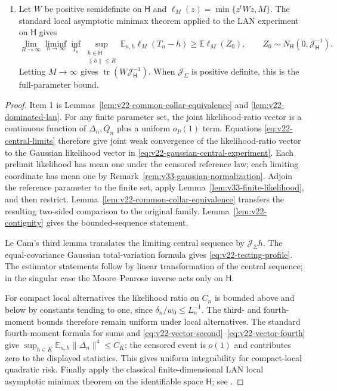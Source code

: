 \begin{theorem}
\begin{enumerate}
\item Let $W$ be positive semidefinite on $\mathsf H$ and
$\ell_M(z)=\min\{z^tWz,M\}$.  The standard local asymptotic minimax theorem
applied to the LAN experiment on $\mathsf H$ gives
\begin{equation}\label{eq:v22-minimax-truncated}
 \lim_{R\to\infty}\liminf_{n\to\infty}
 \inf_{T_n}\sup_{\substack{h\in\mathsf H\\\|h\|\le R}}
 \mathbb E_{n,h}\ell_M(T_n-h)
 \ge
 \mathbb E\ell_M(Z_0),
 \qquad
 Z_0\sim N_{\mathsf H}(0,\mathcal J_{\mathsf H}^{-1}).
\end{equation}
Letting $M\to\infty$ gives
$\operatorname{tr}(W\mathcal J_{\mathsf H}^{-1})$.  When
$\mathcal J_\Sigma$ is positive definite, this is the full-parameter bound.
\end{enumerate}
\end{theorem}

\begin{proof}
Item 1 is Lemmas~\ref{lem:v22-common-collar-equivalence} and
\ref{lem:v22-dominated-lan}.  For any finite parameter set, the joint
likelihood-ratio vector is a continuous function of $\Delta_n,Q_n$ plus a
uniform $o_P(1)$ term.  Equations \eqref{eq:v22-central-limits} therefore give
joint weak convergence of the likelihood-ratio vector to the Gaussian
likelihood vector in \eqref{eq:v22-gaussian-central-experiment}.  Each
prelimit likelihood has mean one under the censored reference law; each
limiting coordinate has mean one by
Remark~\ref{rem:v33-gaussian-normalization}.  Adjoin the reference
parameter to the finite set, apply Lemma~\ref{lem:v33-finite-likelihood},
and then restrict.  Lemma~\ref{lem:v22-common-collar-equivalence}
transfers the resulting two-sided comparison to the original family.
Lemma~\ref{lem:v22-contiguity} gives the bounded-sequence statement.

Le Cam's third lemma translates the limiting central sequence by
$\mathcal J_\Sigma h$.  The equal-covariance Gaussian total-variation formula
gives \eqref{eq:v22-testing-profile}.  The estimator statements follow by
linear transformation of the central sequence; in the singular case the
Moore--Penrose inverse acts only on $\mathsf H$.

For compact local alternatives the likelihood ratio on $C_n$ is bounded above
and below by constants tending to one, since $\delta_n/w_0\le L_n^{-1}$.
The third- and fourth-moment bounds therefore remain uniform under local
alternatives.  The standard fourth-moment formula for sums and
\eqref{eq:v22-vector-second}--\eqref{eq:v22-vector-fourth} give
$\sup_{h\in K}\mathbb E_{n,h}\|\Delta_n\|^4\le C_K$; the censored event is
$o(1)$ and contributes zero to the displayed statistics.  This gives uniform
integrability for compact-local quadratic risk.  Finally apply the classical
finite-dimensional LAN local asymptotic minimax theorem on the identifiable
space $\mathsf H$; see \cite{IbragimovHasminskii,HiranoPorter}.
\end{proof}

